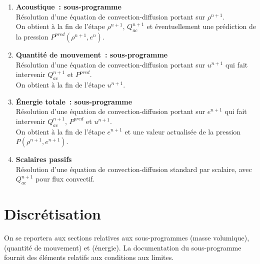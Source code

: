 \begin{enumerate}

  \item {\bf Acoustique~: sous-programme } \\
     Résolution d'une équation de convection-diffusion portant sur $\rho^{n+1}$.\\
     On obtient à la fin de l'étape $\rho^{n+1}$, $Q^{n+1}_{ac}$ et
éventuellement une
pr\'ediction de la pression $P^{pred}(\rho^{n+1},e^{n})$.\\

  \item {\bf Quantit\'e de mouvement~: sous-programme }\\
     Résolution d'une équation de convection-diffusion portant sur $u^{n+1}$ qui
     fait intervenir  $Q^{n+1}_{ac}$ et $P^{pred}$.\\
     On obtient à la fin de l'étape $u^{n+1}$.\\

  \item {\bf \'Energie totale~: sous-programme }\\
     Résolution d'une équation de convection-diffusion portant sur $e^{n+1}$ qui
     fait intervenir  $Q^{n+1}_{ac}$, $P^{pred}$ et  $u^{n+1}$.\\
     On obtient \`a la fin de l'étape $e^{n+1}$ et une valeur actualisée de la
pression $P(\rho^{n+1},e^{n+1})$.\\

  \item {\bf Scalaires passifs}\\
     Résolution d'une équation de convection-diffusion standard par
     scalaire, avec  $Q^{n+1}_{ac}$ pour flux convectif.
\end{enumerate}

\section*{Discr\'etisation}

On se reportera aux sections relatives aux sous-programmes
 (masse volumique), 
(quantit\'e de mouvement) et  (\'energie).
La documentation du sous-programme
 fournit des \'el\'ements relatifs aux
conditions
aux limites.

